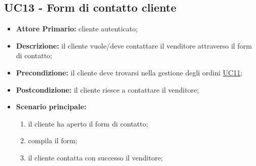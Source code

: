\subsection{UC13 - Form di contatto cliente} 
\label{UC13}
\begin{itemize}
    \item \textbf{Attore Primario:} cliente autenticato;
    \item \textbf{Descrizione:} il cliente vuole/deve contattare il venditore attraverso il form di contatto;
    \item \textbf{Precondizione:} il cliente deve trovarsi nella gestione degli ordini \hyperref[UC11]{UC11};
    \item \textbf{Postcondizione:} il cliente riesce a contattare il venditore;
    \item \textbf{Scenario principale:}
    \begin{enumerate}
        \item il cliente ha aperto il form di contatto;
        \item compila il form;
        \item il cliente contatta con successo il venditore;
    \end{enumerate}
\end{itemize}